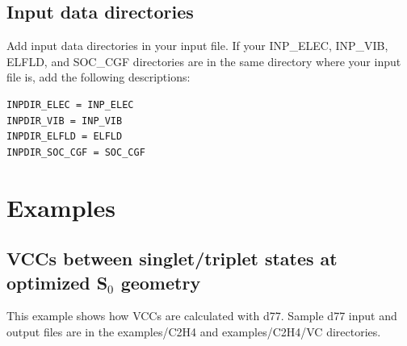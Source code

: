 ﻿\documentclass[11pt,a4paper,openany]{article}
\begin{document}
\subsection{Input data directories}
\noindent
Add input data directories in your input file. 
If your INP\_ELEC, INP\_VIB, ELFLD, and SOC\_CGF directories are in the same directory 
where your input file is, add the following descriptions:
\begin{verbatim}
INPDIR_ELEC = INP_ELEC
INPDIR_VIB = INP_VIB
INPDIR_ELFLD = ELFLD
INPDIR_SOC_CGF = SOC_CGF
\end{verbatim}

\clearpage
\section{Examples}

\subsection{VCCs between singlet/triplet states at optimized S$_0$ geometry}\label{calc_VCC}
This example shows how VCCs are calculated with d77. 
Sample d77 input and output files are in the
examples/C2H4 and 
examples/C2H4/VC directories.
\end{document}
